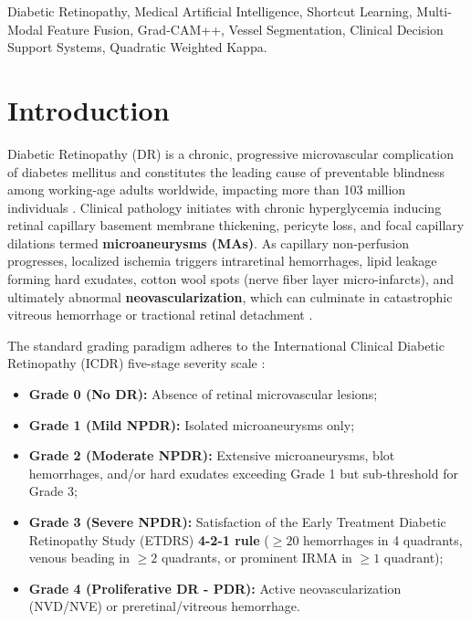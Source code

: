 \documentclass[conference]{IEEEtran}
\begin{document}
\begin{IEEEkeywords}
Diabetic Retinopathy, Medical Artificial Intelligence, Shortcut Learning, Multi-Modal Feature Fusion, Grad-CAM++, Vessel Segmentation, Clinical Decision Support Systems, Quadratic Weighted Kappa.
\end{IEEEkeywords}

\section{Introduction}

Diabetic Retinopathy (DR) is a chronic, progressive microvascular complication of diabetes mellitus and constitutes the leading cause of preventable blindness among working-age adults worldwide, impacting more than 103 million individuals \cite{cheung2010diabetic, yau2012global}. Clinical pathology initiates with chronic hyperglycemia inducing retinal capillary basement membrane thickening, pericyte loss, and focal capillary dilations termed \textbf{microaneurysms (MAs)}. As capillary non-perfusion progresses, localized ischemia triggers intraretinal hemorrhages, lipid leakage forming hard exudates, cotton wool spots (nerve fiber layer micro-infarcts), and ultimately abnormal \textbf{neovascularization}, which can culminate in catastrophic vitreous hemorrhage or tractional retinal detachment \cite{fong2004diabetic}.

The standard grading paradigm adheres to the International Clinical Diabetic Retinopathy (ICDR) five-stage severity scale \cite{wilkinson2003proposed}:
\begin{itemize}
    \item \textbf{Grade 0 (No DR):} Absence of retinal microvascular lesions;
    \item \textbf{Grade 1 (Mild NPDR):} Isolated microaneurysms only;
    \item \textbf{Grade 2 (Moderate NPDR):} Extensive microaneurysms, blot hemorrhages, and/or hard exudates exceeding Grade 1 but sub-threshold for Grade 3;
    \item \textbf{Grade 3 (Severe NPDR):} Satisfaction of the Early Treatment Diabetic Retinopathy Study (ETDRS) \textbf{4-2-1 rule} ($\ge 20$ hemorrhages in 4 quadrants, venous beading in $\ge 2$ quadrants, or prominent IRMA in $\ge 1$ quadrant);
    \item \textbf{Grade 4 (Proliferative DR - PDR):} Active neovascularization (NVD/NVE) or preretinal/vitreous hemorrhage.
\end{itemize}
\end{document}
